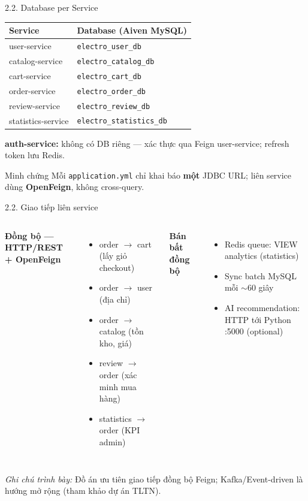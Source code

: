 \documentclass[aspectratio=169,12pt]{beamer}
\begin{document}
\begin{frame}{2.2. Database per Service}
  \begin{table}
    \centering\small
    \begin{tabular}{@{}ll@{}}
      \toprule
      \textbf{Service} & \textbf{Database (Aiven MySQL)} \\
      \midrule
      user-service       & \texttt{electro\_user\_db} \\
      catalog-service  & \texttt{electro\_catalog\_db} \\
      cart-service     & \texttt{electro\_cart\_db} \\
      order-service    & \texttt{electro\_order\_db} \\
      review-service   & \texttt{electro\_review\_db} \\
      statistics-service & \texttt{electro\_statistics\_db} \\
      \bottomrule
    \end{tabular}
  \end{table}

  \textbf{auth-service:} không có DB riêng — xác thực qua Feign user-service; refresh token lưu Redis.

  \vspace{0.3em}
  \begin{block}{Minh chứng}
    Mỗi \texttt{application.yml} chỉ khai báo \textbf{một} JDBC URL; liên service dùng \textbf{OpenFeign}, không cross-query.
  \end{block}
\end{frame}

\begin{frame}{2.2. Giao tiếp liên service}
  \begin{columns}[T]
    \textbf{Đồng bộ — HTTP/REST + OpenFeign}
    \begin{itemize}\small
      \item order $\rightarrow$ cart (lấy giỏ checkout)
      \item order $\rightarrow$ user (địa chỉ)
      \item order $\rightarrow$ catalog (tồn kho, giá)
      \item review $\rightarrow$ order (xác minh mua hàng)
      \item statistics $\rightarrow$ order (KPI admin)
    \end{itemize}

    \textbf{Bán bất đồng bộ}
    \begin{itemize}\small
      \item Redis queue: VIEW analytics (statistics)
      \item Sync batch MySQL mỗi $\sim$60 giây
      \item AI recommendation: HTTP tới Python :5000 (optional)
    \end{itemize}
  \end{columns}

  \vspace{0.5em}
  \textit{Ghi chú trình bày:} Đồ án ưu tiên giao tiếp đồng bộ Feign; Kafka/Event-driven là hướng mở rộng (tham khảo dự án TLTN).
\end{frame}
\end{document}
